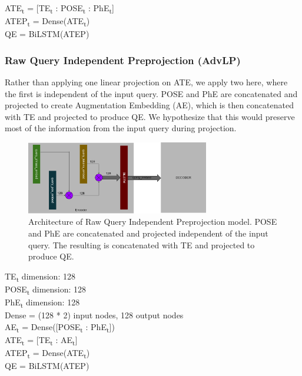 \documentclass{IEEEtran}
\begin{document}
        \hspace*{-3.5mm}ATE\textsubscript{t} = [TE\textsubscript{t} : 
        POSE\textsubscript{t} : PhE\textsubscript{t}] \\
        ATEP\textsubscript{t} = Dense(ATE\textsubscript{t}) \\
        QE = BiLSTM(ATEP) \\

        \subsubsection{Raw Query Independent Preprojection (AdvLP)}
        Rather than applying one linear projection on ATE, we apply two here, where the first is 
        independent of the input query. POSE and PhE are concatenated and projected to create
        Augmentation Embedding (AE), which is then concatenated with TE and projected to produce
        QE. We hypothesize that this would preserve most of the information from the input query
        during projection. \\

        \begin{figure}[h]
          \centering
          \includegraphics[width=8cm]{advlp.png}
          \caption{Architecture of Raw Query Independent Preprojection model. POSE and PhE are
          concatenated and projected independent of the input query. The resulting is 
          concatenated with TE and projected to produce QE.}
          \label{fig:advlp}
        \end{figure}

        \hspace*{-3.5mm}TE\textsubscript{t} dimension: 128 \\
        POSE\textsubscript{t} dimension: 128 \\
        PhE\textsubscript{t} dimension: 128 \\
        Dense = (128 * 2) input nodes, 128 output nodes \\ 

        \hspace*{-3.5mm}AE\textsubscript{t} = Dense([POSE\textsubscript{t} : 
        PhE\textsubscript{t}]) \\
        ATE\textsubscript{t} = [TE\textsubscript{t} : AE\textsubscript{t}] \\
        ATEP\textsubscript{t} = Dense(ATE\textsubscript{t}) \\
        QE = BiLSTM(ATEP) \\
\end{document}
